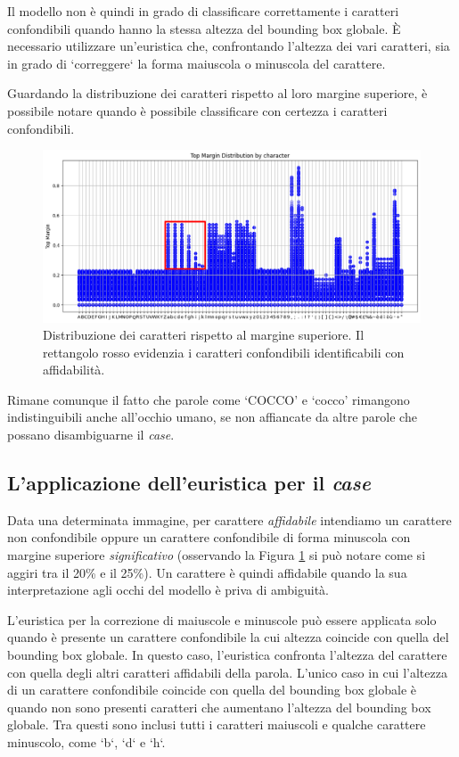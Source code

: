 Il modello non è quindi in grado di classificare correttamente i caratteri confondibili quando hanno la stessa altezza del bounding box globale.
È necessario utilizzare un'euristica che, confrontando l'altezza dei vari caratteri, sia in grado di `correggere` la forma maiuscola o minuscola del carattere.

Guardando la distribuzione dei caratteri rispetto al loro margine superiore, è possibile notare quando è possibile classificare con certezza i caratteri confondibili.

\begin{figure}[H]
	\centering
	\includegraphics[width=1\textwidth]{images/top_margin_distribution_highlight.png}
	\caption{Distribuzione dei caratteri rispetto al margine superiore. Il rettangolo rosso evidenzia i caratteri confondibili identificabili con affidabilità.}
	\label{fig:top_margin_distribution_highlight.png}
\end{figure}

Rimane comunque il fatto che parole come `COCCO' e `cocco' rimangono indistinguibili anche all'occhio umano, se non affiancate da altre parole che possano disambiguarne il \emph{case}.

\subsection{L'applicazione dell'euristica per il \emph{case}}

Data una determinata immagine, per carattere \emph{affidabile} intendiamo un carattere non confondibile oppure un carattere confondibile di forma minuscola con margine superiore \emph{significativo} (osservando la Figura \ref{fig:top_margin_distribution_highlight.png} si può notare come si aggiri tra il 20\% e il 25\%). Un carattere è quindi affidabile quando la sua interpretazione agli occhi del modello è priva di ambiguità.

L'euristica per la correzione di maiuscole e minuscole può essere applicata solo quando è presente un carattere confondibile la cui altezza coincide con quella del bounding box globale. In questo caso, l'euristica confronta l'altezza del carattere con quella degli altri caratteri affidabili della parola.
L'unico caso in cui l'altezza di un carattere confondibile coincide con quella del bounding box globale è quando non sono presenti caratteri che aumentano l'altezza del bounding box globale. Tra questi sono inclusi tutti i caratteri maiuscoli e qualche carattere minuscolo, come `b`, `d` e `h`.

